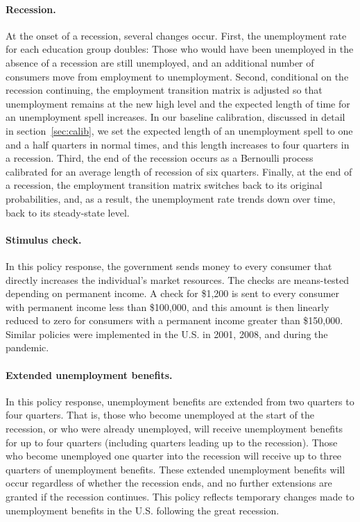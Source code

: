 \documentclass[\econtexRoot/HAFiscal]{subfiles}
\begin{document}
\paragraph{Recession.} At the onset of a recession, several changes occur. First, the unemployment rate for each education group doubles: Those who would have been unemployed in the absence of a recession are still unemployed, and an additional number of consumers move from employment to unemployment. Second, conditional on the recession continuing, the employment transition matrix is adjusted so that unemployment remains at the new high level and the expected length of time for an unemployment spell increases. In our baseline calibration, discussed in detail in section~\ref{sec:calib}, we set the expected length of an unemployment spell to one and a half quarters in normal times, and this length increases to four quarters in a recession. Third, the end of the recession occurs as a Bernoulli process calibrated for an average length of recession of six quarters. Finally, at the end of a recession, the employment transition matrix switches back to its original probabilities, and, as a result, the unemployment rate trends down over time, back to its steady-state level.

\paragraph{Stimulus check.} In this policy response, the government sends money to every consumer that directly increases the individual's market resources. The checks are means-tested depending on permanent income. A check for \$1,200 is sent to every consumer with permanent income less than \$100,000, and this amount is then linearly reduced to zero for consumers with a permanent income greater than \$150,000. Similar policies were implemented in the U.S. in 2001, 2008, and during the pandemic.

\paragraph{Extended unemployment benefits.} In this policy response, unemployment benefits are extended from two quarters to four quarters. That is, those who become unemployed at the start of the recession, or who were already unemployed, will receive unemployment benefits for up to four quarters (including quarters leading up to the recession). Those who become unemployed one quarter into the recession will receive up to three quarters of unemployment benefits. These extended unemployment benefits will occur regardless of whether the recession ends, and no further extensions are granted if the recession continues. This policy reflects temporary changes made to unemployment benefits in the U.S. following the great recession.
\end{document}
